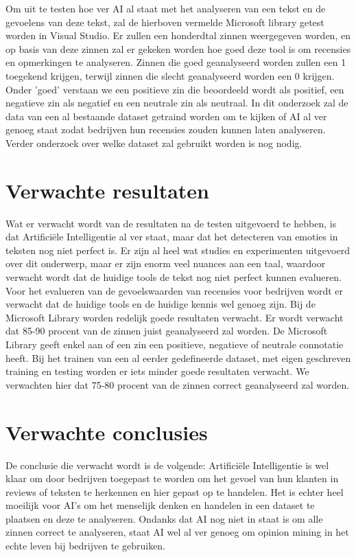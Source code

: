 Om uit te testen hoe ver AI al staat met het analyseren van een tekst en de gevoelens van deze tekst, zal de hierboven vermelde Microsoft library getest worden in Visual Studio. Er zullen een honderdtal zinnen weergegeven worden, en op basis van deze zinnen zal er gekeken worden hoe goed deze tool is om recensies en opmerkingen te analyseren. Zinnen die goed geanalyseerd worden zullen een 1 toegekend krijgen, terwijl zinnen die slecht geanalyseerd worden een 0 krijgen. Onder 'goed' verstaan we een positieve zin die beoordeeld wordt als positief, een negatieve zin als negatief en een neutrale zin als neutraal. 
In dit onderzoek zal de data van een al bestaande dataset getraind worden om te kijken of AI al ver genoeg staat zodat bedrijven hun recensies zouden kunnen laten analyseren. Verder onderzoek over welke dataset zal gebruikt worden is nog nodig.


\section{Verwachte resultaten}
\label{sec:verwachte_resultaten}

Wat er verwacht wordt van de resultaten na de testen uitgevoerd te hebben, is dat Artificiële Intelligentie al ver staat, maar dat het detecteren van emoties in teksten nog niet perfect is. Er zijn al heel wat studies en experimenten uitgevoerd over dit onderwerp, maar er zijn enorm veel nuances aan een taal, waardoor verwacht wordt dat de huidige tools de tekst nog niet perfect kunnen evalueren. Voor het evalueren van de gevoelswaarden van recensies voor bedrijven wordt er verwacht dat de huidige tools en de huidige kennis wel genoeg zijn.
Bij de Microsoft Library worden redelijk goede resultaten verwacht. Er wordt verwacht dat 85-90 procent van de zinnen juist geanalyseerd zal worden. De Microsoft Library geeft enkel aan of een zin een positieve, negatieve of neutrale connotatie heeft. Bij het trainen van een al eerder gedefineerde dataset, met eigen geschreven training en testing worden er iets minder goede resultaten verwacht. We verwachten hier dat 75-80 procent van de zinnen correct geanalyseerd zal worden.



\section{Verwachte conclusies}
\label{sec:verwachte_conclusies}

De conclusie die verwacht wordt is de volgende: Artificiële Intelligentie is wel klaar om door bedrijven toegepast te worden om het gevoel van hun klanten in reviews of teksten te herkennen en hier gepast op te handelen. Het is echter heel moeilijk voor AI’s om het menselijk denken en handelen in een dataset te plaatsen en deze te analyseren. Ondanks dat AI nog niet in staat is om alle zinnen correct te analyseren, staat AI wel al ver genoeg om opinion mining in het echte leven bij bedrijven te gebruiken.

